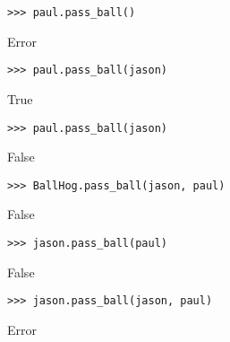 \begin{blocksection}
\begin{lstlisting}
>>> paul.pass_ball()
\end{lstlisting}
\begin{solution}[.2in]
Error
\end{solution}

\begin{lstlisting}
>>> paul.pass_ball(jason)
\end{lstlisting}
\begin{solution}[.2in]
True
\end{solution}

\begin{lstlisting}
>>> paul.pass_ball(jason)
\end{lstlisting}
\begin{solution}[.2in]
False
\end{solution}

\begin{lstlisting}
>>> BallHog.pass_ball(jason, paul)
\end{lstlisting}
\begin{solution}[.2in]
False
\end{solution}

\begin{lstlisting}
>>> jason.pass_ball(paul)
\end{lstlisting}
\begin{solution}[.2in]
False
\end{solution}

\begin{lstlisting}
>>> jason.pass_ball(jason, paul)
\end{lstlisting}
\begin{solution}[.2in]
Error
\end{solution}
\end{blocksection}
